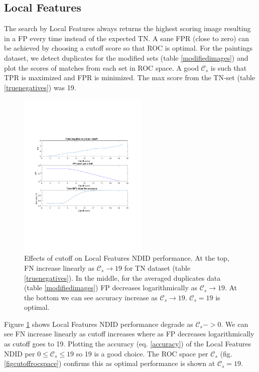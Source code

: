 \documentclass[english,12pt,a4paper,pdftex,elec,utf8]{aaltothesis}
\begin{document}
\subsection{Local Features}
The search by Local Features always returns the highest scoring image resulting in a FP every time instead of the expected TN. A sane FPR (close to zero) can be achieved by choosing a cutoff score so that ROC is optimal. For the paintings dataset, we detect duplicates for the modified sets (table \ref{modifiedimages}) and plot the scores of matches from each set in ROC space. A good $\mathcal{C}_s$ is such that TPR is maximized and FPR is minimized. The max score from the TN-set (table \ref{truenegatives}) was 19.

\begin{figure}[htb]
\begin{center}
\includegraphics[height=8cm]{figures/SIFTCountROC}
\end{center}
\caption{ Effects of cutoff on Local Features NDID performance. At the top, FN increase linearly as $\mathcal{C}_s \rightarrow 19$ for TN dataset (table \ref{truenegatives}). In the middle, for the averaged duplicates data (table \ref{modifiedimages}) FP decreases logarithmically as $\mathcal{C}_s \rightarrow 19$. At the bottom we can see accuracy increase as $\mathcal{C}_s \rightarrow 19$. $\mathcal{C}_s=19$ is optimal.}
\label{figcutoff}
\end{figure}

Figure \ref{figcutoff} shows Local Features NDID performance degrade as $\mathcal{C}_{s}->0$. We can see FN increase linearly as cutoff increases where as FP decreases logarithmically as cutoff goes to 19. Plotting the accuracy (eq. \ref{accuracy}) of the Local Features NDID per $0 \leq \mathcal{C}_{s} \leq 19$ so 19 is a good choice. The ROC space per $\mathcal{C}_s$ (fig. \ref{figcutoffrocspace}) confirms this as optimal performance is shown at $\mathcal{C}_s=19$.
\end{document}
